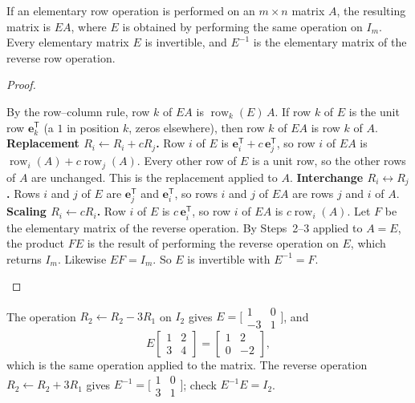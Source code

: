 \documentclass[10pt]{scrartcl}
\newcommand{\vv}[1]{\mathbf{#1}}
\begin{document}
\begin{proposition*}
  If an elementary row operation is performed on an $m\times n$ matrix $A$, the resulting matrix is $EA$, where $E$ is obtained by performing the same operation on $I_m$. Every elementary matrix $E$ is invertible, and $E^{-1}$ is the elementary matrix of the reverse row operation.
\end{proposition*}
\begin{proof}
  \begin{steps}
    \ii By the row--column rule, row $k$ of $EA$ is $\operatorname{row}_k(E)\,A$. If row $k$ of $E$ is the unit row $\vv e_k^{\mathsf T}$ (a $1$ in position $k$, zeros elsewhere), then row $k$ of $EA$ is row $k$ of $A$.
    \ii \textbf{Replacement $R_i\leftarrow R_i+cR_j$.} Row $i$ of $E$ is $\vv e_i^{\mathsf T}+c\,\vv e_j^{\mathsf T}$, so row $i$ of $EA$ is $\operatorname{row}_i(A)+c\operatorname{row}_j(A)$. Every other row of $E$ is a unit row, so the other rows of $A$ are unchanged. This is the replacement applied to $A$.
    \ii \textbf{Interchange $R_i\leftrightarrow R_j$.} Rows $i$ and $j$ of $E$ are $\vv e_j^{\mathsf T}$ and $\vv e_i^{\mathsf T}$, so rows $i$ and $j$ of $EA$ are rows $j$ and $i$ of $A$. \textbf{Scaling $R_i\leftarrow cR_i$.} Row $i$ of $E$ is $c\,\vv e_i^{\mathsf T}$, so row $i$ of $EA$ is $c\operatorname{row}_i(A)$.
    \ii Let $F$ be the elementary matrix of the reverse operation. By Steps~2--3 applied to $A=E$, the product $FE$ is the result of performing the reverse operation on $E$, which returns $I_m$. Likewise $EF=I_m$. So $E$ is invertible with $E^{-1}=F$.
  \end{steps}
\end{proof}

\begin{example*}
The operation $R_2\leftarrow R_2-3R_1$ on $I_2$ gives $E=\bigl[\begin{smallmatrix}1&0\\-3&1\end{smallmatrix}\bigr]$, and
\[
  E\begin{bmatrix}1&2\\3&4\end{bmatrix}=\begin{bmatrix}1&2\\0&-2\end{bmatrix},
\]
which is the same operation applied to the matrix. The reverse operation $R_2\leftarrow R_2+3R_1$ gives $E^{-1}=\bigl[\begin{smallmatrix}1&0\\3&1\end{smallmatrix}\bigr]$; check $E^{-1}E=I_2$.
\end{example*}
\end{document}
